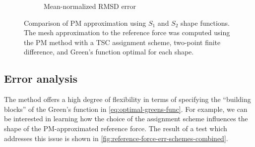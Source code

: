 \begin{figure}[htp]
\begin{subfigure}[b]{0.48\textwidth}
        \caption{Mean-normalized RMSD error}
        \label{fig:reference-force-error-sub}
    \end{subfigure}
    \caption{Comparison of PM approximation using $S_1$ and $S_2$ shape functions.
        The mesh approximation to the reference force was computed using the PM method with a TSC assignment scheme, two-point finite difference, and Green's function optimal for each shape.
    }
    \label{fig:reference-force-combined}
\end{figure}

\subsection{Error analysis}\label{subsec:p3m-error-analysis}
The \PThreeM{} method offers a high degree of flexibility in terms of specifying the ``building blocks'' of the Green's function in \autoref{eq:optimal-greens-func}.
For example, we can be interested in learning how the choice of the assignment scheme influences the shape of the PM-approximated reference force.
The result of a test which addresses this issue is shown in \autoref{fig:reference-force-err-schemes-combined}.
